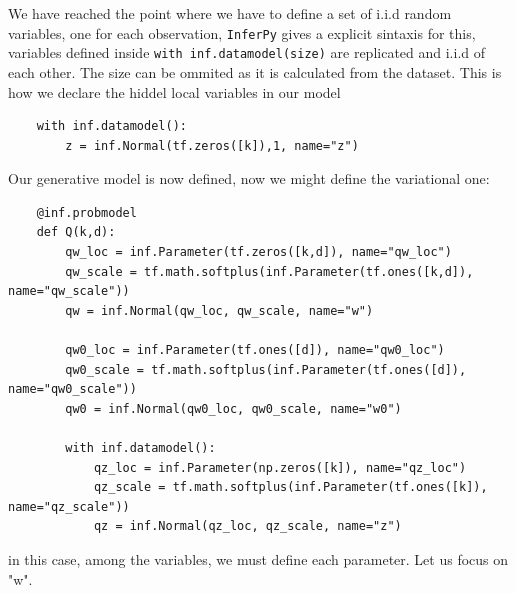 We have reached the point where we have to define a set of i.i.d random variables, one for each observation, \texttt{InferPy} gives a explicit sintaxis for this, variables defined inside \texttt{with inf.datamodel(size)} are replicated and i.i.d of each other. The size can be ommited as it is calculated from the dataset.
This is how we declare the hiddel local variables in our model
\begin{verbatim}
    with inf.datamodel():
        z = inf.Normal(tf.zeros([k]),1, name="z")  
\end{verbatim}

Our generative model is now defined, now we might define the variational one:

\begin{verbatim}
    @inf.probmodel
    def Q(k,d):
        qw_loc = inf.Parameter(tf.zeros([k,d]), name="qw_loc")
        qw_scale = tf.math.softplus(inf.Parameter(tf.ones([k,d]), name="qw_scale"))
        qw = inf.Normal(qw_loc, qw_scale, name="w")

        qw0_loc = inf.Parameter(tf.ones([d]), name="qw0_loc")
        qw0_scale = tf.math.softplus(inf.Parameter(tf.ones([d]), name="qw0_scale"))
        qw0 = inf.Normal(qw0_loc, qw0_scale, name="w0")
    
        with inf.datamodel():
            qz_loc = inf.Parameter(np.zeros([k]), name="qz_loc")
            qz_scale = tf.math.softplus(inf.Parameter(tf.ones([k]), name="qz_scale"))
            qz = inf.Normal(qz_loc, qz_scale, name="z")
\end{verbatim}

in this case, among the variables, we must define each parameter. Let us focus on "w". 